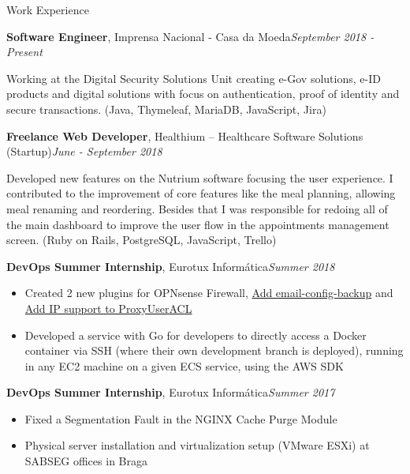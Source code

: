 \documentclass{resume}
\begin{document}
\begin{rSection}{Work Experience}

\begin{rSubsection}
{\textbf{Software Engineer}, Imprensa Nacional - Casa da Moeda}{\em September 2018 - Present}{}{}
\begin{shifted}
Working at the Digital Security Solutions Unit creating e-Gov solutions, e-ID products and digital solutions with focus on authentication, proof of identity and secure transactions. (Java, Thymeleaf, MariaDB, JavaScript, Jira)
\end{shifted}
\end{rSubsection}

\begin{rSubsection}
{\textbf{Freelance Web Developer}, Healthium – Healthcare Software Solutions (Startup)}{\em June - September 2018}{}{}
\begin{shifted}
Developed new features on the Nutrium software focusing the user experience. I contributed to the improvement of core features like the meal planning, allowing meal renaming and reordering. Besides that I was responsible for redoing all of the main dashboard to improve the user flow in the appointments management screen. (Ruby on Rails, PostgreSQL, JavaScript, Trello)
\end{shifted}
\end{rSubsection}

\begin{rSubsection}
{\textbf{DevOps Summer Internship}, Eurotux Informática}{\em Summer 2018}{}{}
\begin{itemize}[noitemsep]
    \item {Created 2 new plugins for OPNsense Firewall, \href{https://github.com/opnsense/plugins/pull/788}{Add email-config-backup} and \href{https://github.com/opnsense/plugins/pull/748}{Add IP support to ProxyUserACL} }
    \item {Developed a service with Go for developers to directly access a Docker container via SSH (where their own development branch is deployed), running in any EC2 machine on a given ECS service, using the AWS SDK}
\end{itemize}
\end{rSubsection}

\begin{rSubsection}
{\textbf{DevOps Summer Internship}, Eurotux Informática}{\em Summer 2017}{}{}
\begin{itemize}[noitemsep]
    \item {Fixed a Segmentation Fault in the NGINX Cache Purge Module}
    \item {Physical server installation and virtualization setup (VMware ESXi) at SABSEG offices in Braga}
\end{itemize}
\end{rSubsection}

\end{rSection}
\end{document}
